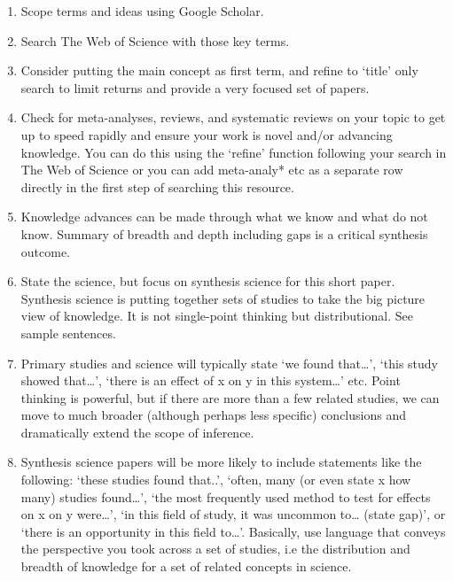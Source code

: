 \documentclass[
]{book}
\providecommand{\tightlist}{%
  \setlength{\itemsep}{0pt}\setlength{\parskip}{0pt}}
\begin{document}
\begin{enumerate}
\def\labelenumi{\arabic{enumi}.}
\tightlist
\item
  Scope terms and ideas using Google Scholar.\\
\item
  Search The Web of Science with those key terms.\\
\item
  Consider putting the main concept as first term, and refine to `title' only search to limit returns and provide a very focused set of papers.\\
\item
  Check for meta-analyses, reviews, and systematic reviews on your topic to get up to speed rapidly and ensure your work is novel and/or advancing knowledge. You can do this using the `refine' function following your search in The Web of Science or you can add meta-analy* etc as a separate row directly in the first step of searching this resource.\\
\item
  Knowledge advances can be made through what we know and what do not know. Summary of breadth and depth including gaps is a critical synthesis outcome.\\
\item
  State the science, but focus on synthesis science for this short paper. Synthesis science is putting together sets of studies to take the big picture view of knowledge. It is not single-point thinking but distributional. See sample sentences.\\
\item
  Primary studies and science will typically state `we found that\ldots{}', `this study showed that\ldots{}', `there is an effect of x on y in this system\ldots{}' etc. Point thinking is powerful, but if there are more than a few related studies, we can move to much broader (although perhaps less specific) conclusions and dramatically extend the scope of inference.\\
\item
  Synthesis science papers will be more likely to include statements like the following: `these studies found that..', `often, many (or even state x how many) studies found\ldots{}', `the most frequently used method to test for effects on x on y were\ldots{}', `in this field of study, it was uncommon to\ldots{} (state gap)', or `there is an opportunity in this field to\ldots{}'. Basically, use language that conveys the perspective you took across a set of studies, i.e the distribution and breadth of knowledge for a set of related concepts in science.\\

\end{enumerate}
\end{document}
